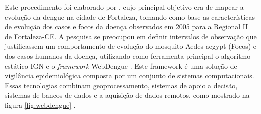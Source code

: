 \begin{figure}[!ht]
	\centering
\end{figure}

Este procedimento foi elaborado por \cite{webdengue2008}, cujo principal objetivo era de mapear a evolução da dengue na cidade de Fortaleza, tomando como base as características de evolução dos casos e focos da doença observados em 2005 para a Regional II de Fortaleza-CE. A pesquisa se preocupou em definir intervalos de observação que justificassem um comportamento de evolução do mosquito Aedes aegypt (Focos) e dos casos humanos da doença, utilizando como ferramenta principal o algoritmo estático IGN e o \textit{framework} WebDengue \cite{webdengue2008}. Este framework é uma solução de vigilância epidemiológica composta por um conjunto de sistemas computacionais. Essas tecnologias combinam geoprocessamento, sistemas de apoio a decisão, sistemas de bancos de dados e a aquisição de dados remotos, como mostrado na figura \ref{fig:webdengue} \cite{webdengue2008}.

